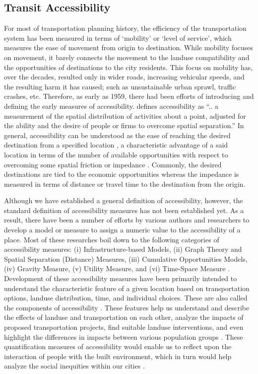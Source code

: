 \documentclass[numbered]{trbunofficial}
\begin{document}
\subsection{Transit Accessibility}
For most of transportation planning history, the efficiency of the transportation system has been measured in terms of ‘mobility’ or ‘level of service’, which measures the ease of movement from origin to destination. While mobility focuses on movement, it barely connects the movement to the landuse compatibility and the opportunities of destinations to the city residents. This focus on mobility has, over the decades, resulted only in wider roads, increasing vehicular speeds, and the resulting harm it has caused; such as unsustainable urban sprawl, traffic crashes, etc. Therefore, as early as 1959, there had been efforts of introducing and defining the early measures of accessibility. \citep{Hansen1959} defines accessibility as “.. a measurement of the spatial distribution of activities about a point, adjusted for the ability and the desire of people or firms to overcome spatial separation.” In general, accessibility can be understood as the ease of reaching the desired destination from a specified location \cite{NazariAdli2019}, a characteristic advantage of a said location in terms of the number of available opportunities with respect to overcoming some spatial friction or impedance \cite{Ingram1971}. Commonly, the desired destinations are tied to the economic opportunities whereas the impedance is measured in terms of distance or travel time to the destination from the origin.

Although we have established a general definition of accessibility, however, the standard definition of accessibility measures has not been established yet. As a result, there have been a number of efforts by various authors and researchers to develop a model or measure to assign a numeric value to the accessibility of a place. Most of these researches boil down to the following categories of accessibility measures: (i) Infrastructure-based Models, (ii) Graph Theory and Spatial Separation (Distance) Measures, (iii) Cumulative Opportunities Models, (iv) Gravity Measure, (v) Utility Measure, and (vi) Time-Space Measure \cite{Geurs2001,Bhat2000,Pirie1979,Koenig1980}. Development of these accessibility measures have been primarily intended to understand the characteristic feature of a given location based on transportation options, landuse distribution, time, and individual choices. These are also called the components of accessibility \cite{Geurs2001}. These features help us understand and describe the effects of landuse and transportation on each other, analyze the impacts of proposed transportation projects, find suitable landuse interventions, and even highlight the differences in impacts between various population groups \cite{Bhat2000,Pirie1979}. These quantification measures of accessibility would enable us to reflect upon the interaction of people with the built environment, which in turn would help analyze the social inequities within our cities \cite{Bhat2000}.
\end{document}
